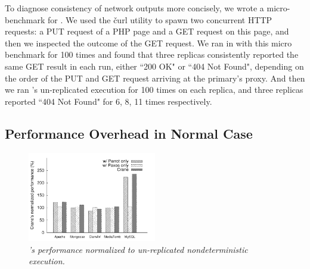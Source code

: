 To diagnose consistency of network outputs more concisely, we wrote a 
micro-benchmark for \apache. We used the \v{curl} utility to spawn two 
concurrent HTTP requests: a PUT request of a PHP page and a GET request on 
this page, and then we inspected the outcome of the GET request. We ran \apache 
in \xxx with this micro benchmark for 100 times and found that three replicas 
consistently reported the same GET result in each run, either ``200 OK" or 
``404 Not Found", depending on the order of the PUT and GET request arriving at 
the primary's proxy. And then we ran \apache's un-replicated 
execution for 100 times on each replica, and three replicas reported ``404 Not 
Found" for 6, 8, 11 times respectively.

\subsection{Performance Overhead in Normal Case} \label{sec:overhead}

\begin{figure}[t]
\centering
\includegraphics[width=0.5\textwidth]{figures/normalize-perf}
\vspace{-.30in}
\caption{\small {\em \xxx's performance normalized to un-replicated 
nondeterministic execution.}}
\label{fig:normalize-perf}
\end{figure}



